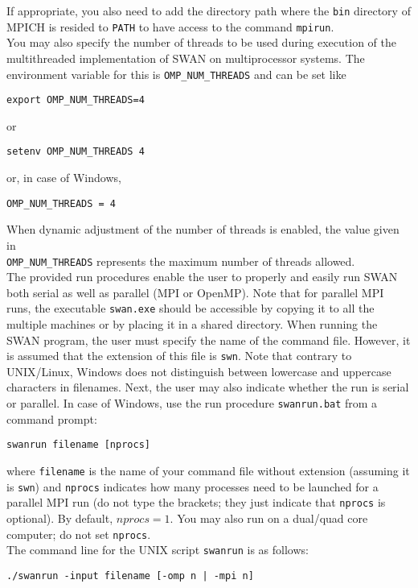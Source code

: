 \documentclass[12pt]{book}
\begin{document}
\noindent
If appropriate, you also need to add the directory path where the {\tt bin} directory of MPICH
is resided to {\small \tt PATH} to have access to the command {\tt mpirun}.
\\[2ex]
\noindent
You may also specify the number of threads to be used during execution of the multithreaded
implementation of SWAN on multiprocessor systems. The environment variable for this is
{\small \tt OMP\_NUM\_THREADS} and can be set like
\begin{verbatim}
export OMP_NUM_THREADS=4
\end{verbatim}
or
\begin{verbatim}
setenv OMP_NUM_THREADS 4
\end{verbatim}
or, in case of Windows,
\begin{verbatim}
OMP_NUM_THREADS = 4
\end{verbatim}
When dynamic adjustment of the number of threads is enabled, the value given in\\
{\small \tt OMP\_NUM\_THREADS} represents the maximum number of threads allowed.
\\[2ex]
\noindent
The provided run procedures enable the user to properly and easily run SWAN both serial as
well as parallel (MPI or OpenMP). Note that for parallel MPI runs, the executable {\tt swan.exe}
should be accessible by copying it to all the multiple machines or by placing it in a shared
directory. When running the SWAN program, the user must specify the name of the command file.
However, it is assumed that the extension of this file is {\tt swn}. Note that contrary to
UNIX/Linux, Windows does not distinguish between lowercase and uppercase characters in filenames.
Next, the user may also indicate whether the run is serial or parallel. In case of Windows, use
the run procedure {\tt swanrun.bat} from a command prompt:
\begin{verbatim}
swanrun filename [nprocs]
\end{verbatim}
where {\tt filename} is the name of your command file without extension (assuming it is {\tt swn})
and {\tt nprocs} indicates how many processes need to be launched for a parallel MPI run (do not
type the brackets; they just indicate that {\tt nprocs} is optional). By default, $nprocs = 1$.
You may also run on a dual/quad core computer; do not set {\tt nprocs}.
\\[2ex]
\noindent
The command line for the UNIX script {\tt swanrun} is as follows:
\begin{verbatim}
./swanrun -input filename [-omp n | -mpi n]
\end{verbatim}
\end{document}
